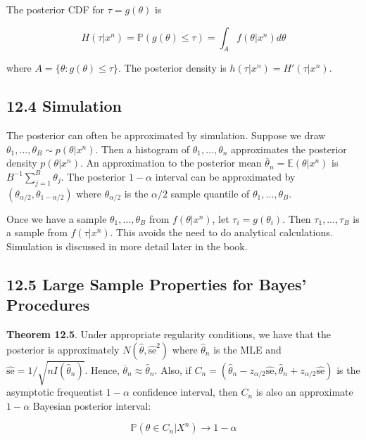 The posterior CDF for \(\tau = g(\theta)\) is

\[ H(\tau | x^{n}) = \mathbb{P}(g(\theta) \leq \tau) = \int_A f(\theta | x^{n}) d\theta\]

where \(A = \{ \theta : g(\theta) \leq \tau \}\). The posterior density
is \(h(\tau | x^{n}) = H'(\tau | x^{n})\).

\subsection*{12.4 Simulation}\label{bayesian:simulation}

The posterior can often be approximated by simulation. Suppose we draw
\(\theta_{1}, \dots, \theta_B \sim p(\theta | x^{n})\). Then a histogram of
\(\theta_{1}, \dots, \theta_{n}\) approximates the posterior density
\(p(\theta | x^{n})\). An approximation to the posterior mean
\(\overline{\theta}_{n} = \mathbb{E}(\theta | x^{n})\) is
\(B^{-1} \sum_{j=1}^B \theta_{j}\). The posterior \(1 - \alpha\) interval
can be approximated by \((\theta_{\alpha/2}, \theta_{1 - \alpha/2})\)
where \(\theta_{\alpha/2}\) is the \(\alpha/2\) sample quantile of
\(\theta_{1}, \dots, \theta_B\).

Once we have a sample \(\theta_{1}, \dots, \theta_B\) from
\(f(\theta | x^{n})\), let \(\tau_{i} = g(\theta_{i})\). Then
\(\tau_{1}, \dots, \tau_B\) is a sample from \(f(\tau | x^{n})\). This
avoids the need to do analytical calculations. Simulation is discussed
in more detail later in the book.

\subsection*{12.5 Large Sample Properties for Bayes'
Procedures}\label{large-sample-properties-for-bayes-procedures}

\textbf{Theorem 12.5}. Under appropriate regularity conditions, we have
that the posterior is approximately
\(N(\hat{\theta}, \hat{\text{se}}^{2})\) where \(\hat{\theta}_{n}\) is the
MLE and \(\hat{\text{se}} = 1 / \sqrt{nI(\hat{\theta}_{n})}\). Hence,
\(\overline{\theta}_{n} \approx \hat{\theta}_{n}\). Also, if
\(C_{n} = (\hat{\theta}_{n} - z_{\alpha/2} \hat{\text{se}}, \hat{\theta}_{n} + z_{\alpha/2} \hat{\text{se}})\)
is the asymptotic frequentist \(1 - \alpha\) confidence interval, then
\(C_{n}\) is also an approximate \(1 - \alpha\) Bayesian posterior
interval:

\[\mathbb{P}(\theta \in C_{n} | X^{n}) \rightarrow 1 - \alpha\]

